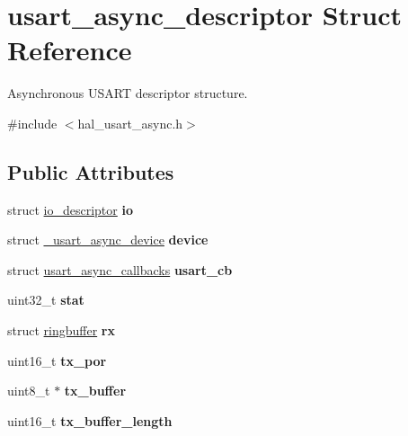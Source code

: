 \hypertarget{structusart__async__descriptor}{}\section{usart\+\_\+async\+\_\+descriptor Struct Reference}
\label{structusart__async__descriptor}


Asynchronous U\+S\+A\+RT descriptor structure.  




{\ttfamily \#include $<$hal\+\_\+usart\+\_\+async.\+h$>$}

\subsection*{Public Attributes}
\begin{DoxyCompactItemize}
\item 
\mbox{\label{structusart__async__descriptor_a0b567a552bb9024872536444202911f3}} 
struct \hyperlink{structio__descriptor}{io\+\_\+descriptor} {\bfseries io}
\item 
\mbox{\label{structusart__async__descriptor_a48ab054cada0897a439c0889ff769bbf}} 
struct \hyperlink{struct__usart__async__device}{\+\_\+usart\+\_\+async\+\_\+device} {\bfseries device}
\item 
\mbox{\label{structusart__async__descriptor_a84b19b1c19b845d0c2870ab306955b91}} 
struct \hyperlink{structusart__async__callbacks}{usart\+\_\+async\+\_\+callbacks} {\bfseries usart\+\_\+cb}
\item 
\mbox{\label{structusart__async__descriptor_aa3b7aeba241416b7061e967d7832b203}} 
uint32\+\_\+t {\bfseries stat}
\item 
\mbox{\label{structusart__async__descriptor_a36cb240b43ed5ac70fb4b3cca1bcd071}} 
struct \hyperlink{structringbuffer}{ringbuffer} {\bfseries rx}
\item 
\mbox{\label{structusart__async__descriptor_aecbbb71691ffede25d2ec628947a4305}} 
uint16\+\_\+t {\bfseries tx\+\_\+por}
\item 
\mbox{\label{structusart__async__descriptor_a9ed199abede0cb07c2b91aeb443d3ada}} 
uint8\+\_\+t $\ast$ {\bfseries tx\+\_\+buffer}
\item 
\mbox{\label{structusart__async__descriptor_a0a4c5301c869bb18cb57deb866707e66}} 
uint16\+\_\+t {\bfseries tx\+\_\+buffer\+\_\+length}
\end{DoxyCompactItemize}



